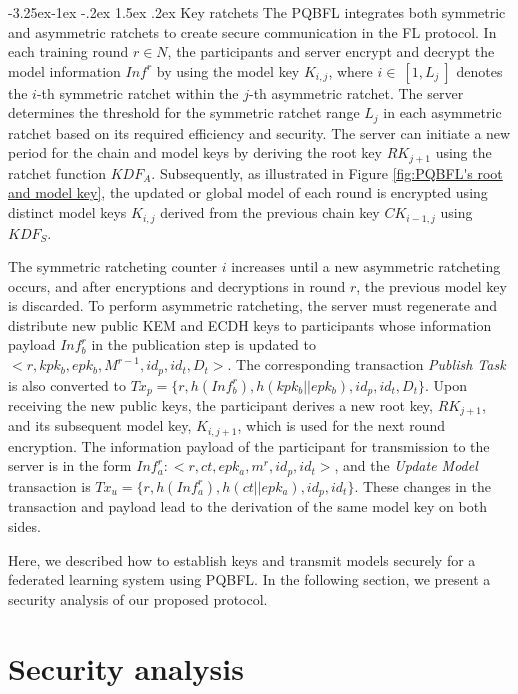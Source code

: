 \documentclass[a4paper,fleqn]{cas-dc}
\makeatletter
\renewcommand\subsubsection{\@startsection{subsubsection}{3}{\z@}%
   {-3.25ex\@plus -1ex \@minus -.2ex}%
   {1.5ex \@plus .2ex}%
   {\normalfont\normalsize}} %
\makeatother
\begin{document}
\subsubsection{Key ratchets} 
The PQBFL integrates both symmetric and asymmetric ratchets to create secure communication in the FL protocol.
In each training round $r\in N$, the participants and server encrypt and decrypt the model information $Inf^{r}$ by using the model key $K_{i,j}$, where $i\in \ [1,L_{j}\ ]$ denotes the $i$-th symmetric ratchet within the $j$-th asymmetric ratchet.
The server determines the threshold for the symmetric ratchet range $L_{j}$ in each asymmetric ratchet based on its required efficiency and security.
The server can initiate a new period for the chain and model keys by deriving the root key $RK_{j+1}$ using the ratchet function $KDF_{A}$.
Subsequently, as illustrated in Figure \ref{fig:PQBFL's root and model key}, the updated or global model of each round is encrypted using distinct model keys $K_{i,j}$ derived from the previous chain key $CK_{i-1,j}$ using $KDF_{S}$.

The symmetric ratcheting counter $i$ increases until a new asymmetric ratcheting occurs, and after encryptions and decryptions in round $r$, the previous model key is discarded.
To perform asymmetric ratcheting, the server must regenerate and distribute new public KEM and ECDH keys to participants whose information payload $Inf_{b}^{r}$ in the publication step is updated to $<r,kpk_{b},epk_{b},M^{r-1},id_{p},id_{t},D_{t}>$.
The corresponding transaction \textit{Publish Task} is also converted to $Tx_{p}=\{r,h(Inf_{b}^{r}),h(kpk_{b}||epk_{b}),id_{p},id_{t},D_{t}\}$.
Upon receiving the new public keys, the participant derives a new root key, $RK_{j+1}$, and its subsequent model key, $K_{i,j+1}$, which is used for the next round encryption.
The information payload of the participant for transmission to the server is in the form $Inf_{a}^{r}: <r,ct,epk_{a},m^{r},id_{p},id_{t}>$, and the \textit{Update Model} transaction is $Tx_{u}=\{r,h(Inf_{a}^{r}),h(ct||epk_{a}),id_{p},id_{t}\}$.
These changes in the transaction and payload lead to the derivation of the same model key on both sides.

Here, we described how to establish keys and transmit models securely for a federated learning system using PQBFL. 
In the following section, we present a security analysis of our proposed protocol.




\section{Security analysis}
\label{Security Analysis}
\end{document}
